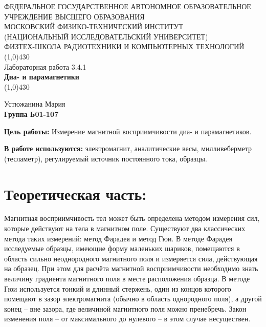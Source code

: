 \documentclass[11pt]{article}
\begin{document}
\begin{titlepage}
\begin{center}
\large{\small ФЕДЕРАЛЬНОЕ ГОСУДАРСТВЕННОЕ АВТОНОМНОЕ ОБРАЗОВАТЕЛЬНОЕ\\ УЧРЕЖДЕНИЕ ВЫСШЕГО ОБРАЗОВАНИЯ\\ МОСКОВСКИЙ ФИЗИКО-ТЕХНИЧЕСКИЙ ИНСТИТУТ\\ (НАЦИОНАЛЬНЫЙ ИССЛЕДОВАТЕЛЬСКИЙ УНИВЕРСИТЕТ)\\ ФИЗТЕХ-ШКОЛА РАДИОТЕХНИКИ И КОМПЬЮТЕРНЫХ ТЕХНОЛОГИЙ}
\vfill
\line(1,0){430}\\[1mm]
\huge{Лабораторная работа 3.4.1}\\
\huge\textbf{Диа- и парамагнетики}\\
\line(1,0){430}\\[1mm]
\vfill
\begin{flushright}
\normalsize{Устюжанина Мария}\\
\normalsize{\textbf{Группа Б01-107}}\\
\end{flushright}
\end{center}
\end{titlepage}

\par \textbf{Цель работы:} Измерение магнитной восприимчивости диа- и парамагнетиков.

\par \textbf{В работе используются:} электромагнит, аналитические весы, милливеберметр (тесламетр), регулируемый источник постоянного тока, образцы.

\section{Теоретическая часть:} 

Магнитная восприимчивость тел может быть определена методом измерения сил, которые действуют на тела в магнитном поле. Существуют два классических метода таких измерений: метод Фарадея и метод Гюи. В методе Фарадея исследуемые образцы, имеющие форму маленьких шариков, помещаются в область сильно неоднородного магнитного поля и измеряется сила, действующая на образец. При этом для расчёта магнитной восприимчивости необходимо знать величину градиента магнитного поля в месте расположения образца. В методе Гюи используется тонкий и длинный стержень, один из концов которого помещают в зазор электромагнита (обычно в область однородного поля), а другой конец -- вне зазора, где величиной магнитного поля можно пренебречь. Закон изменения поля -- от максимального до нулевого -- в этом случае несуществен.
\end{document}
